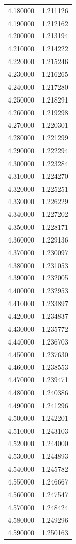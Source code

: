 \begin{tabular}{rr}
4.180000 & 1.211126 \\
4.190000 & 1.212162 \\
4.200000 & 1.213194 \\
4.210000 & 1.214222 \\
4.220000 & 1.215246 \\
4.230000 & 1.216265 \\
4.240000 & 1.217280 \\
4.250000 & 1.218291 \\
4.260000 & 1.219298 \\
4.270000 & 1.220301 \\
4.280000 & 1.221299 \\
4.290000 & 1.222294 \\
4.300000 & 1.223284 \\
4.310000 & 1.224270 \\
4.320000 & 1.225251 \\
4.330000 & 1.226229 \\
4.340000 & 1.227202 \\
4.350000 & 1.228171 \\
4.360000 & 1.229136 \\
4.370000 & 1.230097 \\
4.380000 & 1.231053 \\
4.390000 & 1.232005 \\
4.400000 & 1.232953 \\
4.410000 & 1.233897 \\
4.420000 & 1.234837 \\
4.430000 & 1.235772 \\
4.440000 & 1.236703 \\
4.450000 & 1.237630 \\
4.460000 & 1.238553 \\
4.470000 & 1.239471 \\
4.480000 & 1.240386 \\
4.490000 & 1.241296 \\
4.500000 & 1.242201 \\
4.510000 & 1.243103 \\
4.520000 & 1.244000 \\
4.530000 & 1.244893 \\
4.540000 & 1.245782 \\
4.550000 & 1.246667 \\
4.560000 & 1.247547 \\
4.570000 & 1.248424 \\
4.580000 & 1.249296 \\
4.590000 & 1.250163 \\

\end{tabular}
